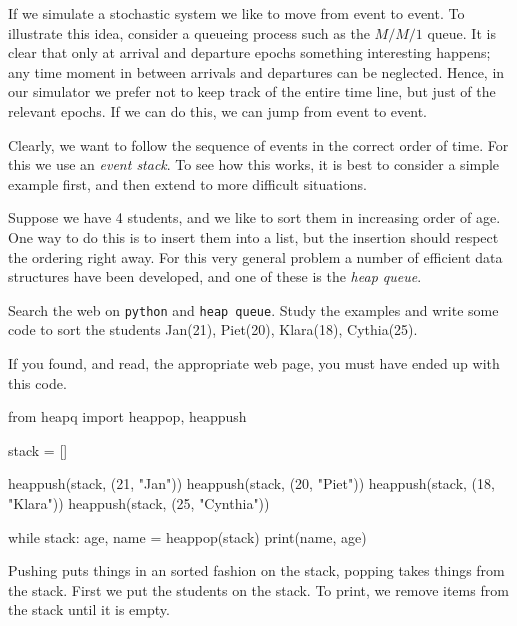 \documentclass{scrartcl}
\begin{document}
If we simulate a stochastic system we like to move from event to event. To illustrate this idea, consider a  queueing process such as the $M/M/1$ queue.
It is clear that only at arrival and departure epochs something interesting happens; any time moment in between arrivals and departures can be neglected. Hence, in our simulator we prefer not to keep track of the entire time line, but just of the relevant epochs. If we can do this, we can jump from event to event.  

Clearly, we want to follow the sequence of events in the correct order of time. For this we use an \emph{event stack}.  To see how this works, it is best to consider a simple example first, and then extend to more difficult situations. 

Suppose we have 4 students, and we like to sort them in increasing order of age. One way to do this is to insert them into a list, but the insertion should respect the ordering right away. For this very general problem a number of efficient data structures have been developed, and one of these is the \emph{heap queue}.

\begin{exercise}
  Search the web on \texttt{python} and \texttt{heap queue}. Study the examples and write some code to sort the students Jan(21), Piet(20), Klara(18), Cythia(25).

  \begin{solution}
If you found, and read, the appropriate web page, you must have ended up with this code.
\begin{pyblock}
from heapq import heappop, heappush

stack = []

heappush(stack, (21, "Jan"))
heappush(stack, (20, "Piet"))
heappush(stack, (18, "Klara"))
heappush(stack, (25, "Cynthia"))

while stack:
    age, name = heappop(stack)
    print(name, age)

  \end{pyblock}

Pushing puts things in an sorted fashion on the stack, popping takes things from the stack. First we put the students on the stack. To print, we remove items from the stack until it is empty.
\end{solution}
  
\end{exercise}
\end{document}
